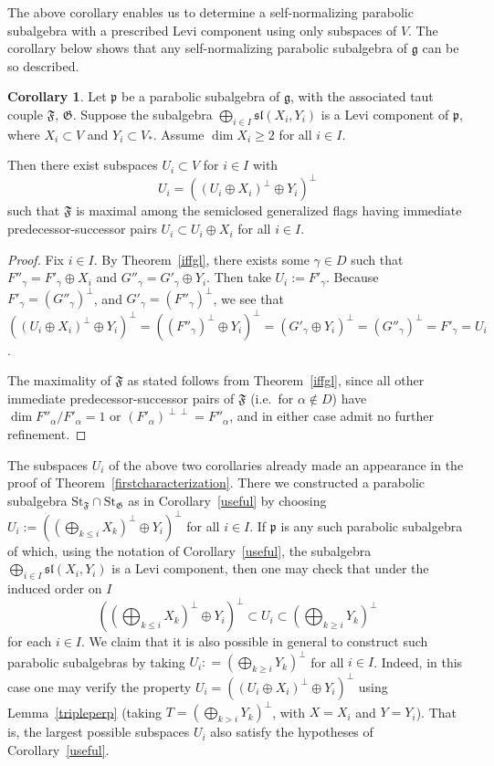 \documentclass{amsart}
\theoremstyle{definition}
\newtheorem{cor}[theorem]{Corollary}
\theoremstyle{remark}
\numberwithin{equation}{section}
\newcommand {\St} {\mathrm{St}}
\def\g{\mathfrak {g}}
\def\p{\mathfrak {p}}
\def\sl{\mathfrak{sl}}
\def\F{\mathfrak{F}}
\def\G{\mathfrak{G}}
\begin{document}
The above corollary enables us to determine a self-normalizing parabolic subalgebra with a prescribed Levi component using only subspaces of $V$.  The corollary below shows that any self-normalizing parabolic subalgebra of $\g$ can be so described.


\begin{cor} \label{fullcor}
Let $\p$ be a parabolic subalgebra of $\g$, with the associated taut couple $\F$, $\G$.  Suppose the subalgebra $\bigoplus_{i \in I} \sl(X_i,Y_i)$ is a Levi component of $\p$, where $X_i \subset V$ and $Y_i \subset V_*$.  Assume $\dim X_i \geq 2$ for all $i \in I$.    

Then there exist subspaces $U_i \subset V$ for $i \in I$ with
$$U_i = ((U_i \oplus X_i)^\perp \oplus Y_i )^\perp$$
such that $\F$ is maximal among the semiclosed generalized flags having immediate predecessor-successor pairs
$U_i \subset U_i \oplus X_i$ for all $i \in I$.
\end{cor}

\begin{proof}
Fix $i \in I$.  By Theorem~\ref{iffgl}, there exists some $\gamma \in D$ such that $F''_\gamma = F'_\gamma \oplus X_i$ and $G''_\gamma = G'_\gamma \oplus Y_i$.  Then take $U_i := F'_\gamma$.  Because $F'_\gamma = (G''_\gamma)^\perp$, and $G'_\gamma = (F''_\gamma)^\perp$, we see that $((U_i \oplus X_i)^\perp \oplus Y_i)^\perp = ((F''_\gamma)^\perp \oplus Y_i)^\perp = (G'_\gamma \oplus Y_i)^\perp = (G''_\gamma)^\perp = F'_\gamma = U_i$.

The maximality of $\F$ as stated follows from Theorem~\ref{iffgl}, since all other immediate predecessor-successor pairs of $\F$ (i.e.\ for $\alpha \notin D$) have $\dim F''_\alpha / F'_\alpha = 1$ or $(F'_\alpha)^{\perp \perp} = F''_\alpha$, and in either case admit no further refinement.
\end{proof}


The subspaces $U_i$ of the above two corollaries already made an appearance in the proof of Theorem~\ref{firstcharacterization}.  There we constructed a parabolic subalgebra $\St_\F \cap \St_\G$ as in Corollary~\ref{useful} by choosing $U_i := ((\bigoplus_{k \leq i} X_k)^\perp \oplus Y_i)^\perp$ for all $i \in I$.  If $\p$ is any such parabolic subalgebra of which, using the notation of Corollary~\ref{useful}, the subalgebra $\bigoplus_{i \in I} \sl(X_i, Y_i)$ is a Levi component, then one may check that under the induced order on $I$
$$((\bigoplus_{k \leq i} X_k)^\perp \oplus Y_i)^\perp \subset U_i \subset (\bigoplus_{k \geq i} Y_k)^\perp$$
for each $i \in I$.
We claim that it is also possible in general to construct such parabolic subalgebras by taking $U_i : = (\bigoplus_{k \geq i} Y_k)^\perp$ for all $i \in I$.  Indeed, in this case one may verify the property $U_i = ((U_i \oplus X_i)^\perp \oplus Y_i)^\perp$ using Lemma~\ref{tripleperp} (taking $T = (\bigoplus_{k > i} Y_k)^\perp$, with $X=X_i$ and $Y=Y_i$).  That is, the largest possible subspaces $U_i$ also satisfy the hypotheses of Corollary~\ref{useful}.
\end{document}
